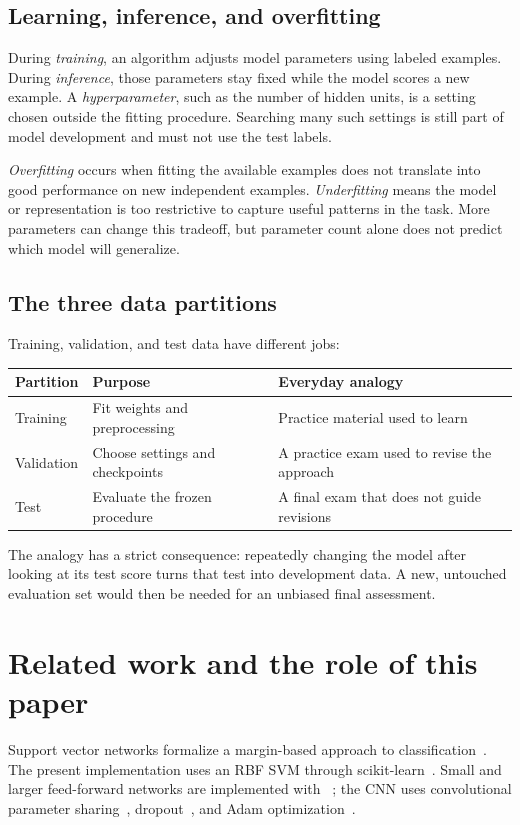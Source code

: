 \documentclass[11pt,letterpaper]{article}
\newcommand{\code}[1]{\texttt{\detokenize{#1}}}
\begin{document}
\subsection{Learning, inference, and overfitting}
During \emph{training}, an algorithm adjusts model parameters using labeled
examples. During \emph{inference}, those parameters stay fixed while the model
scores a new example. A \emph{hyperparameter}, such as the number of hidden
units, is a setting chosen outside the fitting procedure. Searching many such
settings is still part of model development and must not use the test labels.

\emph{Overfitting} occurs when fitting the available examples does not translate
into good performance on new independent examples. \emph{Underfitting} means
the model or representation is too restrictive to capture useful patterns in
the task. More parameters can change this tradeoff, but parameter count alone
does not predict which model will generalize.

\subsection{The three data partitions}
Training, validation, and test data have different jobs:
\begin{center}
\begin{tabularx}{\linewidth}{@{}lYY@{}}
\toprule
Partition & Purpose & Everyday analogy \\
\midrule
Training & Fit weights and preprocessing & Practice material used to learn \\
Validation & Choose settings and checkpoints & A practice exam used to revise the approach \\
Test & Evaluate the frozen procedure & A final exam that does not guide revisions \\
\bottomrule
\end{tabularx}
\end{center}
The analogy has a strict consequence: repeatedly changing the model after
looking at its test score turns that test into development data. A new,
untouched evaluation set would then be needed for an unbiased final assessment.

\section{Related work and the role of this paper}
Support vector networks formalize a margin-based approach to
classification~\cite{svmoriginal}. The present implementation uses an RBF SVM
through scikit-learn~\cite{svc}. Small and larger feed-forward networks are
implemented with \code{MLPClassifier}~\cite{mlp}; the CNN uses convolutional
parameter sharing~\cite{convbook}, dropout~\cite{dropout}, and Adam
optimization~\cite{adam}.
\end{document}
